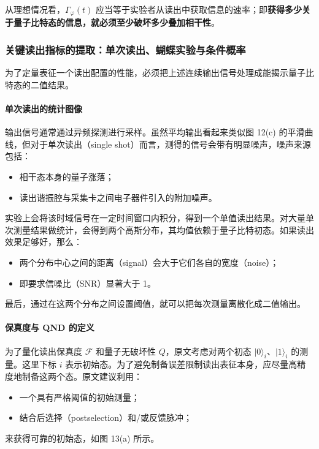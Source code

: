 \documentclass[12pt,a4paper,oneside]{ctexbook}
\begin{document}
从理想情况看，\(\Gamma_\varphi(t)\) 应当等于实验者从读出中获取信息的速率；即\textbf{获得多少关于量子比特态的信息，就必须至少破坏多少叠加相干性}。

\subsubsection{关键读出指标的提取：单次读出、蝴蝶实验与条件概率}

为了定量表征一个读出配置的性能，必须把上述连续输出信号处理成能揭示量子比特态的二值结果。

\paragraph{单次读出的统计图像}
输出信号通常通过异频探测进行采样。虽然平均输出看起来类似图 12(c) 的平滑曲线，但对于单次读出（single shot）而言，测得的信号会带有明显噪声，噪声来源包括：
\begin{itemize}
    \item 相干态本身的量子涨落；
    \item 读出谐振腔与采集卡之间电子器件引入的附加噪声。
\end{itemize}

实验上会将该时域信号在一定时间窗口内积分，得到一个单值读出结果。对大量单次测量结果做统计，会得到两个高斯分布，其均值依赖于量子比特初态。如果读出效果足够好，那么：
\begin{itemize}
    \item 两个分布中心之间的距离（signal）会大于它们各自的宽度（noise）；
    \item 即要求信噪比（SNR）显著大于 1。
\end{itemize}

最后，通过在这两个分布之间设置阈值，就可以把每次测量离散化成二值输出。

\paragraph{保真度与 QND 的定义}
为了量化读出保真度 \(\mathcal{F}\) 和量子无破坏性 \(Q\)，原文考虑对两个初态 \(|0\rangle_i\)、\(|1\rangle_i\) 的测量。这里下标 \(i\) 表示初始态。为了避免制备误差限制读出表征本身，应尽量高精度地制备这两个态。原文建议利用：
\begin{itemize}
    \item 一个具有严格阈值的初始测量；
    \item 结合后选择（postselection）和/或反馈脉冲；
\end{itemize}
来获得可靠的初始态，如图 13(a) 所示。
\end{document}
